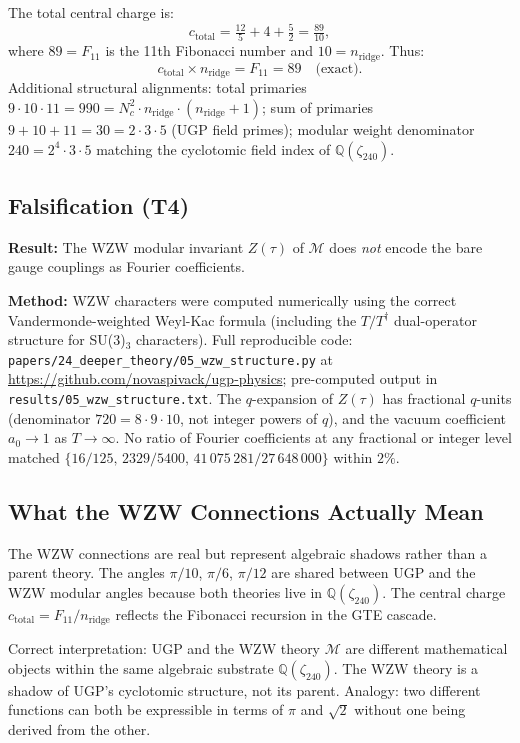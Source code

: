 \documentclass[11pt]{article}
\theoremstyle{remark}
\newcommand{\Nc}{N_c}
\newcommand{\zetaN}[1]{\zeta_{#1}}
\begin{document}
The total central charge is:
\[
  c_{\mathrm{total}} = \tfrac{12}{5} + 4 + \tfrac{5}{2} = \tfrac{89}{10},
\]
where $89 = F_{11}$ is the 11th Fibonacci number and $10 = n_{\mathrm{ridge}}$.
Thus:
\[
  \boxed{c_{\mathrm{total}} \times n_{\mathrm{ridge}} = F_{11} = 89} \quad \text{(exact)}.
\]
Additional structural alignments:
total primaries $9 \cdot 10 \cdot 11 = 990 = \Nc^2 \cdot n_{\mathrm{ridge}} \cdot (n_{\mathrm{ridge}}+1)$;
sum of primaries $9+10+11 = 30 = 2 \cdot 3 \cdot 5$ (UGP field primes);
modular weight denominator $240 = 2^4 \cdot 3 \cdot 5$ matching the cyclotomic
field index of $\mathbb{Q}(\zetaN{240})$.

\subsection{Falsification (T4)}

\textbf{Result:}  The WZW modular invariant $Z(\tau)$ of $\mathcal{M}$ does \emph{not}
encode the bare gauge couplings as Fourier coefficients.

\textbf{Method:}  WZW characters were computed numerically using the correct
Vandermonde-weighted Weyl-Kac formula (including the $T/T^\dagger$ dual-operator
structure for SU(3)$_3$ characters).
Full reproducible code:
\texttt{papers/24\_deeper\_theory/05\_wzw\_structure.py} at
\url{https://github.com/novaspivack/ugp-physics}; pre-computed output in
\texttt{results/05\_wzw\_structure.txt}.
The $q$-expansion of $Z(\tau)$ has fractional $q$-units (denominator $720 = 8\cdot9\cdot10$,
not integer powers of $q$), and the vacuum coefficient $a_0 \to 1$ as $T \to \infty$.
No ratio of Fourier coefficients at any fractional or integer level matched
$\{16/125,\, 2329/5400,\, 41\,075\,281/27\,648\,000\}$ within $2\%$.

\subsection{What the WZW Connections Actually Mean}

The WZW connections are real but represent algebraic shadows rather than a
parent theory.
The angles $\pi/10$, $\pi/6$, $\pi/12$ are shared between UGP and the WZW modular
angles because both theories live in $\mathbb{Q}(\zetaN{240})$.
The central charge $c_{\mathrm{total}} = F_{11}/n_{\mathrm{ridge}}$ reflects the
Fibonacci recursion in the GTE cascade.

Correct interpretation: UGP and the WZW theory $\mathcal{M}$ are different mathematical
objects within the same algebraic substrate $\mathbb{Q}(\zetaN{240})$.
The WZW theory is a shadow of UGP's cyclotomic structure, not its parent.
Analogy: two different functions can both be expressible in terms of $\pi$ and
$\sqrt{2}$ without one being derived from the other.
\end{document}
